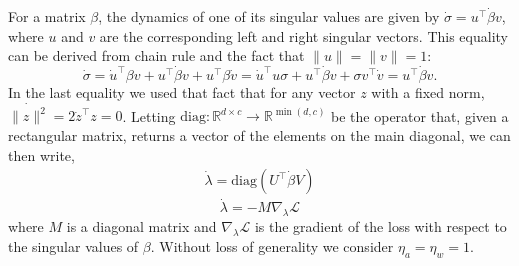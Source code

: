 \documentclass{article}
\theoremstyle{plain}
\theoremstyle{definition}
\theoremstyle{remark}
\begin{document}
For a matrix $\beta$, the dynamics of one of its singular values are given by $\dot{\sigma} = u^\intercal \dot{\beta} v$, where $u$ and $v$ are the corresponding left and right singular vectors.
%
This equality can be derived from chain rule and the fact that $\|u\| = \|v\| = 1$:
\begin{equation}
    \dot{\sigma} = \dot{u}^\intercal \beta v + u^\intercal \dot{\beta} v + u^\intercal \beta \dot{v} = \dot{u}^\intercal u \sigma + u^\intercal \dot{\beta} v + \sigma v^\intercal \dot{v} = u^\intercal \dot{\beta} v.
\end{equation}
In the last equality we used that fact that for any vector $z$ with a fixed norm, $\dot{\|z\|^2} = 2\dot{z}^\intercal z = 0$.
%
Letting $\mathrm{diag}: \mathbb{R}^{d \times c} \to \mathbb{R}^{\min(d, c)}$ be the operator that, given a rectangular matrix, returns a vector of the elements on the main diagonal, we can then write,
\begin{align}
    \dot{\lambda} = \mathrm{diag}(U^\intercal \dot{\beta} V)
\end{align}
%
\begin{equation}
    \dot{\lambda} = -M \nabla_\lambda \mathcal{L} 
\end{equation}
where $M$ is a diagonal matrix and $\nabla_\lambda \mathcal{L}$ is the gradient of the loss with respect to the singular values of $\beta$. 
%
Without loss of generality we consider $\eta_a = \eta_w = 1$.
\end{document}
